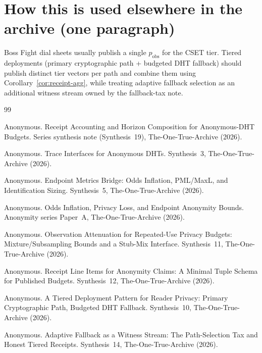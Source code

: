 \documentclass[11pt]{article}
\theoremstyle{definition}
\begin{document}
\section{How this is used elsewhere in the archive (one paragraph)}
Boss Fight dial sheets usually publish a single $p_{\mathrm{obs}}$ for the CSET tier.
Tiered deployments (primary cryptographic path + budgeted DHT fallback) should publish distinct tier vectors per path and combine them using Corollary~\ref{cor:receipt-agg}, while treating adaptive fallback selection as an additional witness stream owned by the fallback-tax note.\cite{series:tieredpattern,series:fallbacktax}

\begin{thebibliography}{99}\small

Anonymous.
\newblock Receipt Accounting and Horizon Composition for Anonymous-DHT Budgets.
\newblock Series synthesis note (Synthesis~19), The-One-True-Archive (2026).

Anonymous.
\newblock Trace Interfaces for Anonymous DHTs.
\newblock Synthesis~3, The-One-True-Archive (2026).

Anonymous.
\newblock Endpoint Metrics Bridge: Odds Inflation, PML/MaxL, and Identification Sizing.
\newblock Synthesis~5, The-One-True-Archive (2026).

Anonymous.
\newblock Odds Inflation, Privacy Loss, and Endpoint Anonymity Bounds.
\newblock Anonymity series Paper~A, The-One-True-Archive (2026).

Anonymous.
\newblock Observation Attenuation for Repeated-Use Privacy Budgets: Mixture/Subsampling Bounds and a Stub-Mix Interface.
\newblock Synthesis~11, The-One-True-Archive (2026).

Anonymous.
\newblock Receipt Line Items for Anonymity Claims: A Minimal Tuple Schema for Published Budgets.
\newblock Synthesis~12, The-One-True-Archive (2026).

Anonymous.
\newblock A Tiered Deployment Pattern for Reader Privacy: Primary Cryptographic Path, Budgeted DHT Fallback.
\newblock Synthesis~10, The-One-True-Archive (2026).

Anonymous.
\newblock Adaptive Fallback as a Witness Stream: The Path-Selection Tax and Honest Tiered Receipts.
\newblock Synthesis~14, The-One-True-Archive (2026).

\end{thebibliography}
\end{document}

